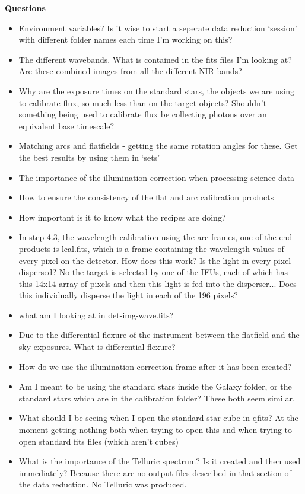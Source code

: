 \documentclass{literature}
\begin{document}
\textbf{Questions}
\begin{itemize}
\item Environment variables? Is it wise to start a seperate data reduction `session' with different folder names each time I'm working on this? 
\item The different wavebands. What is contained in the fits files I'm looking at? Are these combined images from all the different NIR bands? 
\item Why are the exposure times on the standard stars, the objects we are using to calibrate flux, so much less than on the target objects? Shouldn't something being used to calibrate flux be collecting photons over an equivalent base timescale? 
\item Matching arcs and flatfields - getting the same rotation angles for these. Get the best results by using them in `sets' 
\item The importance of the illumination correction when processing science data
\item How to ensure the consistency of the flat and arc calibration products 
\item How important is it to know what the recipes are doing?
\item In step 4.3, the wavelength calibration using the arc frames, one of the end products is lcal.fits, which is a frame containing the wavelength values of every pixel on the detector. How does this work? Is the light in every pixel dispersed? No the target is selected by one of the IFUs, each of which has this 14x14 array of pixels and then this light is fed into the disperser... Does this individually disperse the light in each of the 196 pixels? 
\item what am I looking at in det-img-wave.fits? 
\item Due to the differential flexure of the instrument between the flatfield and the sky exposures. What is differential flexure? 
\item How do we use the illumination correction frame after it has been created? 	
\item Am I meant to be using the standard stars inside the Galaxy folder, or the standard stars which are in the calibration folder? These both seem similar. 
\item What should I be seeing when I open the standard star cube in qfits? At the moment getting nothing both when trying to open this and when trying to open standard fits files (which aren't cubes)
\item What is the importance of the Telluric spectrum? Is it created and then used immediately? Because there are no output files described in that section of the data reduction. No Telluric was produced.

\end{itemize}
\end{document}
